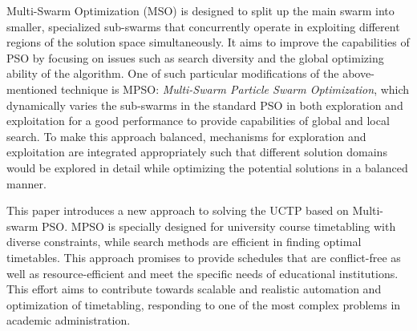 Multi-Swarm Optimization (MSO) is designed to split up the main swarm into smaller, specialized sub-swarms that concurrently operate in exploiting different regions of the solution space simultaneously. \cite{Bacanin2022-multiswarm} \cite{MultiSwarm2004} It aims to improve the capabilities of PSO by focusing on issues such as search diversity and the global optimizing ability of the algorithm. \cite{XIA2018126} One of such particular modifications of the above-mentioned technique is MPSO: \textit{Multi-Swarm Particle Swarm Optimization}, which dynamically varies the sub-swarms in the standard PSO in both exploration and exploitation for a good performance to provide capabilities of global and local search. \cite{MultiSwarm2004} \cite{Blackwell2006-ms} \cite{XIA2018126} To make this approach balanced, mechanisms for exploration and exploitation are integrated appropriately such that different solution domains would be explored in detail while optimizing the potential solutions in a balanced manner. \cite{Wang2023-ps} 

This paper introduces a new approach to solving the UCTP based on Multi-swarm PSO. MPSO is specially designed for university course timetabling with diverse constraints, while search methods are efficient in finding optimal timetables. This approach promises to provide schedules that are conflict-free as well as resource-efficient and meet the specific needs of educational institutions. This effort aims to contribute towards scalable and realistic automation and optimization of timetabling, responding to one of the most complex problems in academic administration.

